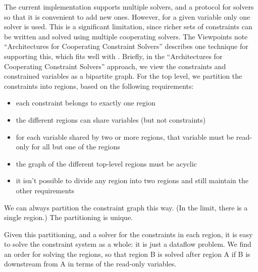 The current implementation supports multiple solvers, and a protocol
for solvers so that it is convenient to add new ones.  However, for a
given variable only one solver is used.  This is a significant
limitation, since richer sets of constraints can be written and solved
using multiple cooperating solvers.  The Viewpoints note
``Architectures for Cooperating Constraint Solvers''
\cite{borning-coop-solvers-2012} describes one technique for
supporting this, which fits well with \langname.
Briefly, in the ``Architectures for Cooperating Constraint Solvers''
approach, we view the constraints and constrained variables as a
bipartite graph.  For the top level, we partition the constraints into
regions, based on the following requirements:
\begin{itemize}
\item each constraint belongs to exactly one region
\item the different regions can share variables (but not constraints)
\item for each variable shared by two or more regions, that variable
  must be read-only for all but one of the regions
\item the graph of the different top-level regions must be acyclic
\item it isn't possible to divide any region into two regions and
  still maintain the other requirements
\end{itemize}

We can always partition the constraint graph this way.  (In the limit,
there is a single region.)  The partitioning is unique.

Given this partitioning, and a solver for the constraints in each
region, it is easy to solve the constraint system as a whole: it is just
a dataflow problem.  We find an order for solving the regions, so that
region B is solved after region A if B is downstream from A in terms
of the read-only variables.



